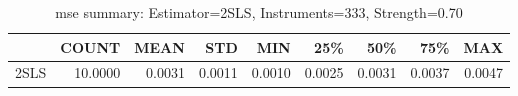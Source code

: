 \begin{table}[ht]
\centering
\caption{mse summary: Estimator=2SLS, Instruments=333, Strength=0.70}
\begin{tabular}{lrrrrrrrr}
\toprule
 & COUNT & MEAN & STD & MIN & 25\% & 50\% & 75\% & MAX \\
\midrule
2SLS & 10.0000 & 0.0031 & 0.0011 & 0.0010 & 0.0025 & 0.0031 & 0.0037 & 0.0047 \\
\bottomrule
\end{tabular}
\end{table}
